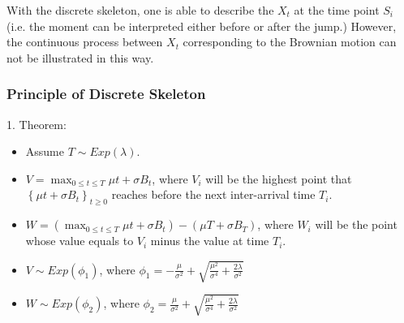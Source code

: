 With the discrete skeleton, one is able to describe the ${X}_t$ at the time point ${S}_i$ (i.e. the moment can be interpreted either before or after the jump.) However, the continuous process between ${X}_t$ corresponding to the Brownian motion can not be illustrated in this way.



\subsubsection{Principle of Discrete Skeleton}
1. Theorem\cite{Brownian}:
\begin{itemize}
    \item Assume $ T \sim E x p(\lambda)$.
    \item $ V=\max _{0 \leq t \leq T} \mu t+\sigma B_{t}$, where $V_{i}$ will be the highest point that $\left\{\mu t+\sigma B_{t}\right\}_{t \geq 0}$ reaches before the next inter-arrival time $T_{i}$.
    \item $W=\left(\max _{0 \leq t \leq T} \mu t+\sigma B_{t}\right)-\left(\mu T+\sigma B_{T}\right)$, where ${W}_{i}$ will be the point whose value equals to $V_{i}$ minus the value at time $T_{i}$.
    \item $V \sim E x p\left(\phi_{1}\right)$, where
    $\phi_{1}=-\frac{\mu}{\sigma^{2}}+\sqrt{\frac{\mu^{2}}{\sigma^{4}}+\frac{2 \lambda}{\sigma^{2}}}$
    \item $W \sim E x p\left(\phi_{2}\right)$, where 
    $\phi_{2}=\frac{\mu}{\sigma^{2}}+\sqrt{\frac{\mu^{2}}{\sigma^{4}}+\frac{2 \lambda}{\sigma^{2}}}$
\end{itemize}

